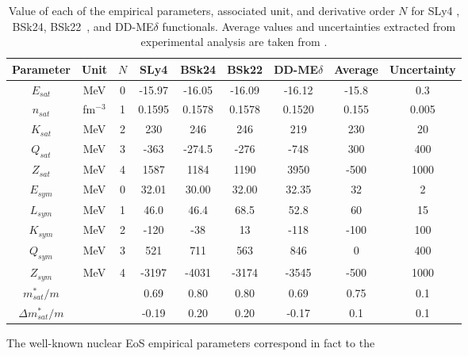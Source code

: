 \begin{table}
\begin{center}
\begin{tabular}{ccccccccc} 
  \toprule
  \toprule
  Parameter & Unit & $N$ & SLy4 & BSk24 & BSk22 & DD-ME$\delta$ & Average & Uncertainty\\
  \midrule
  $E_{sat}$ & MeV & 0         & -15.97 & -16.05  & -16.09    & -16.12 & -15.8 & 0.3   \\
  $n_{sat}$ & fm$^{-3}$ & 1   & 0.1595 &  0.1578 & 0.1578    & 0.1520 & 0.155 & 0.005 \\ 
  $K_{sat}$ & MeV & 2         & 230    &  246    & 246       & 219    & 230   & 20    \\ 
  $Q_{sat}$ & MeV & 3         & -363   &  -274.5 & -276      & -748   & 300   & 400   \\ 
  $Z_{sat}$ & MeV & 4         & 1587   &  1184   & 1190      & 3950   & -500  & 1000  \\ 
  $E_{sym}$ & MeV & 0         & 32.01  &  30.00  & 32.00     & 32.35  & 32    & 2     \\
  $L_{sym}$ & MeV & 1         & 46.0   &  46.4   & 68.5      & 52.8   & 60    & 15    \\
  $K_{sym}$ & MeV & 2         & -120   &  -38    & 13        & -118   & -100  & 100   \\
  $Q_{sym}$ & MeV & 3         & 521    &  711    & 563       & 846    & 0     & 400   \\
  $Z_{sym}$ & MeV & 4         & -3197  &  -4031  & -3174     & -3545  & -500  & 1000  \\
  $m_{sat}^*/m$ & &           & 0.69   &  0.80   & 0.80      & 0.69   & 0.75  & 0.1   \\
  $\Delta m_{sat}^*/m$ & &    & -0.19  &  0.20   & 0.20      & -0.17  & 0.1   & 0.1   \\
  \bottomrule
  \bottomrule
\end{tabular}
\end{center}
\caption[Empirical parameters for SLy4, BSk24, BSk22, and DD-ME$\delta$, and
extracted from nuclear experiments]{Value of each of the empirical parameters, 
  associated unit, and derivative order $N$ for 
  SLy4 \cite{Chabanat1998}, BSk24, BSk22~\cite{Goriely2013}, and 
  DD-ME$\delta$ \cite{RocaMaza2011} functionals.
Average values and uncertainties extracted from experimental analysis are taken
from \cite{Margueron2018a}.}\label{table:emp_params}
\end{table}
%
The well-known nuclear EoS empirical parameters correspond in fact to the 
